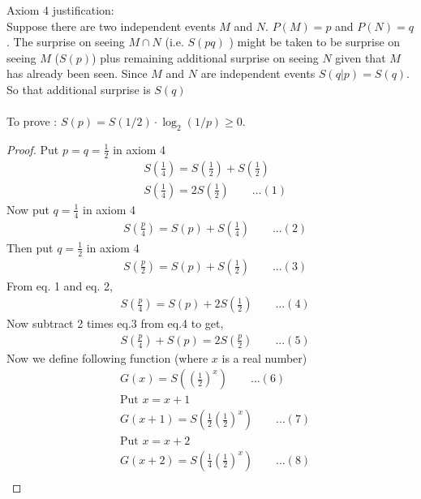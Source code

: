 \documentclass[12pt]{article}
\begin{document}
  \begin{solution}
    
  Axiom 4 justification:\\ Suppose there are two independent events $M$ and $N$. $P(M)=p$ and $P(N)=q$. The surprise on seeing $M \cap N$ (i.e. $S(pq)$ ) might be taken to be surprise on seeing $M$ ($S(p)$) plus remaining additional surprise on seeing $N$ given that $M$ has already been seen. Since $M$ and $N$ are independent events $S(q|p)=S(q)$. So that additional surprise is $S(q)$\\\\
  To prove : $S(p) = S(1/2) \cdot \log_2 (1/p) \geq 0$.
  \begin{proof}
  
  
  Put $p=q=\frac{1}{2}$ in axiom 4
  \begin{align*}
      &S\left(\frac{1}{4}\right) = S\left(\frac{1}{2}\right) + S\left(\frac{1}{2}\right)\\
      &S\left(\frac{1}{4}\right) = 2S\left(\frac{1}{2}\right)\quad\quad...(1)
  \end{align*}
  Now put $q=\frac{1}{4}$ in axiom 4
  \begin{align*}
      &S\left(\frac{p}{4}\right) = S(p) + S\left(\frac{1}{4}\right)\quad\quad...(2)
  \end{align*}
  Then put $q=\frac{1}{2}$ in axiom 4
  \begin{align*}
      &S\left(\frac{p}{2}\right) = S(p) + S\left(\frac{1}{2}\right)\quad\quad...(3)
  \end{align*}
  From eq. 1 and eq. 2,
  \begin{align*}
      &S\left(\frac{p}{4}\right) = S(p) + 2S\left(\frac{1}{2}\right)\quad\quad...(4)
  \end{align*}
  Now subtract 2 times eq.3 from eq.4 to get,
  \begin{align*}
      & S\left(\frac{p}{4}\right)+S(p) = 2S\left(\frac{p}{2}\right)\quad\quad...(5)
  \end{align*}
  Now we define following function (where $x$ is a real number)
  \begin{align*}
      &G(x)=S\left(\left(\frac{1}{2}\right)^x\right)\quad\quad...(6)\\
      &\textrm{Put $x=x+1$}\\
      &G(x+1)=S\left(\frac{1}{2}\left(\frac{1}{2}\right)^x\right)\quad\quad...(7)\\
      &\textrm{Put $x=x+2$}\\
      &G(x+2)=S\left(\frac{1}{4}\left(\frac{1}{2}\right)^x\right)\quad\quad...(8)\\

\end{align*}
\end{proof}
\end{solution}
\end{document}
